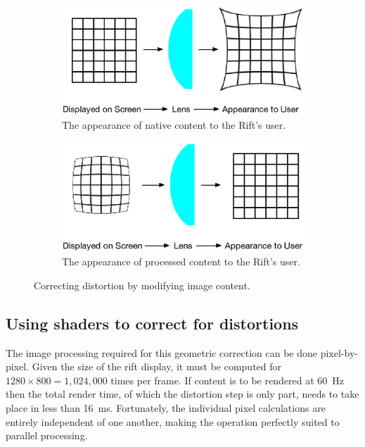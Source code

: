 \documentclass[MSc,paper=a4,pagesize=auto]{icldt}
\begin{document}
\begin{figure}[htbp!]
\centering
\begin{subfigure}{0.9\textwidth}
    \centering
    \includegraphics[width=0.9\linewidth]{resources/appearance_unprocessed}
    \caption{The appearance of native content to the Rift's user.}
	\label{fig:appearance_unprocessed}
\end{subfigure}
\centering
\begin{subfigure}{0.9\textwidth}
    \centering
    \includegraphics[width=0.9\linewidth]{resources/appearance_processed}
    \caption{The appearance of processed content to the Rift's user.}
	\label{fig:appearance_processed}
\end{subfigure}    
    \caption{Correcting distortion by modifying image content.}
    \label{fig:processing_content}
\end{figure}

\clearpage

\subsection{Using shaders to correct for distortions}
The image processing required for this geometric correction can be done pixel-by-pixel. Given the size of the rift display, it must be computed for $1280 \times 800 = 1,024,000$ times per frame. If content is to be rendered at \SI{60}{Hz} then the total render time, of which the distortion step is only part, needs to take place in less than \SI{16}{ms}. Fortunately, the individual pixel calculations are entirely independent of one another, making the operation perfectly suited to parallel processing. 
\end{document}
